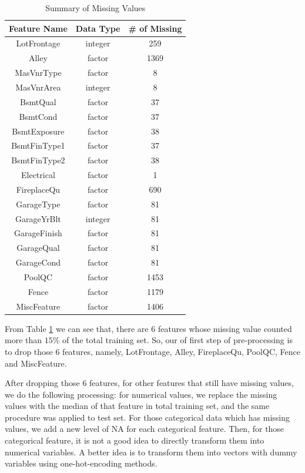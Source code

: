 \documentclass[12pt]{article}
\begin{document}
\begin{table}[htb]
 \caption{Summary of Missing Values} \label{table}
\begin{center}
  \begin{tabular}{  c  c  c }
    \hline
    Feature Name & Data Type & \# of Missing\\ \hline
    LotFrontage    & integer     & 259 \\
    Alley                & factor    & 1369 \\
    MasVnrType    & factor        & 8 \\
    MasVnrArea    & integer        & 8 \\
    BsmtQual        & factor        & 37 \\
    BsmtCond        & factor        & 37 \\
    BsmtExposure    & factor       & 38 \\
    BsmtFinType1    & factor        & 37 \\
    BsmtFinType2    & factor        & 38 \\
    Electrical            & factor        & 1 \\
    FireplaceQu        & factor        & 690 \\
    GarageType        & factor       & 81  \\
    GarageYrBlt        & integer        & 81 \\
    GarageFinish        & factor        & 81 \\
    GarageQual        & factor        & 81 \\
    GarageCond        & factor        & 81 \\
    PoolQC                & factor        & 1453 \\
    Fence                & factor        & 1179 \\
    MiscFeature        & factor        & 1406 \\
    \hline
  \end{tabular}
\end{center}
\end{table}

From Table \ref{table} we can see that, there are 6 features whose missing value counted more than $15\%$ of the total training set. So, our of first step of pre-processing is to drop those 6 features, namely, LotFrontage, Alley, FireplaceQu, PoolQC, Fence and MiscFeature. 

After dropping those 6 features, for other features that still have missing values, we do the following processing: for numerical values, we replace the missing values with the median of that feature in total training set, and the same procedure was applied to test set. For those categorical data which has missing values, we add a new level of NA for each categorical feature. Then, for those categorical feature, it is not a good idea to directly transform them into numerical variables. A better idea is to transform them into vectors with dummy variables using one-hot-encoding methods. 
\end{document}
